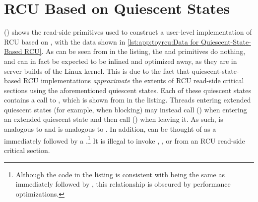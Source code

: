 \section{RCU Based on Quiescent States}
\label{sec:app:toyrcu:RCU Based on Quiescent States}

\begin{fcvref}
()
shows the read-side primitives used to construct a user-level
implementation of RCU based on , with the data shown in
\cref{lst:app:toyrcu:Data for Quiescent-State-Based RCU}.
As can be seen from  in the listing,
the 
and  primitives do nothing, and can in fact
be expected to be inlined and optimized away, as they are in
server builds of the Linux kernel.
This is due to the fact that quiescent-state-based RCU implementations
\emph{approximate} the extents of RCU read-side critical sections
using the aforementioned quiescent states.
Each of these quiescent states contains a call to
, which is shown from
 in the listing.
Threads entering extended quiescent states (for example, when blocking)
may instead call 
() when entering
an extended quiescent state and then call
() when leaving it.
As such,  is analogous to 
and  is analogous to .
In addition,  can be thought of as a
 immediately followed by a
.\footnote{
	Although the code in the listing is consistent with
	being the same as  immediately followed by
	, this relationship is obscured by
	performance optimizations.}
It is illegal to invoke , ,
or  from an RCU read-side critical section.
\end{fcvref}

\begin{listing}

\caption{Data for Quiescent-State-Based RCU}
\label{lst:app:toyrcu:Data for Quiescent-State-Based RCU}
\end{listing}

\begin{listing}

\caption{Quiescent-State-Based RCU Read Side}
\label{lst:app:toyrcu:Quiescent-State-Based RCU Read Side}
\end{listing}

